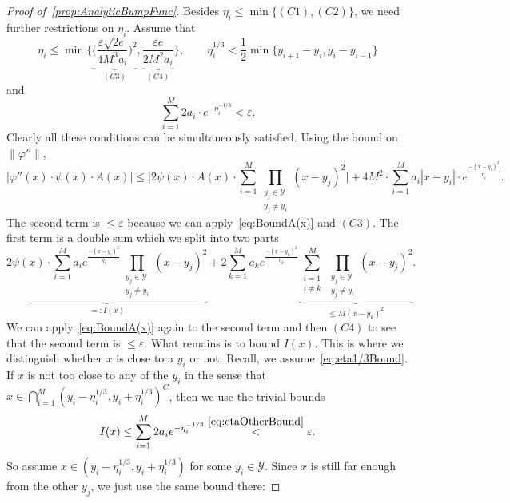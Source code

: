 \documentclass[12pt,]{article}
\theoremstyle{definition}
\theoremstyle{remark}
\newcommand{\0}{\mathbf{0}}
\begin{document}
{\begin{proof}[Proof of~\cref{prop:AnalyticBumpFunc}]
Besides $\eta_i\leq\min\{(C1),(C2)\}$, we need further restrictions on $\eta_i$. Assume that
\begin{equation}\label{eq:eta1/3Bound}
	\eta_i\leq \min \bigg\{ \underbrace{ \Big( \frac{\varepsilon\sqrt{2e}}{4M^3a_i} \Big)^2 }_{(C3)}, \underbrace{ \frac{\varepsilon e}{2M^2a_i} }_{(C4)} \bigg\},\qquad
	\eta_i^{1/3} < \frac{1}{2} \min\big\{ y_{i+1}-y_i, y_i-y_{i-1} \big\} 
\end{equation}
and
\begin{equation}\label{eq:etaOtherBound}
	\sum_{i=1}^M 2a_i\cdot e^{-\eta_i^{-1/3}} < \varepsilon.
\end{equation}
Clearly all these conditions can be simultaneously satisfied. Using the bound on $\|\varphi''\|$,
\begin{equation*}
	\big|\varphi''(x)\cdot \psi(x)\cdot A(x)\big|\leq  \bigg| 2\psi(x)\cdot A(x)\cdot \sum_{i=1}^{M}  \prod_{\substack{y_j\in\mathcal{Y}\\ y_j\neq y_i}} (x-y_j)^2 \bigg| + 4M^2\cdot \sum_{i=1}^{M} a_i|x-y_i| \cdot e^{\frac{-(x-y_i)^2}{\eta_i}}.
\end{equation*}
The second term is $\leq \varepsilon$ because we can apply~\cref{eq:BoundA(x)} and $(C3)$. The first term is a double sum which we split into two parts
\begin{equation*}
	\underbrace{2\psi(x)\cdot  \sum_{i=1}^{M} a_i e^{\frac{-(x-y_i)^2}{\eta_i}} \prod_{\substack{y_j\in\mathcal{Y}\\ y_j\neq y_i}} (x-y_j)^2}_{=: I(x)} +
	2 \sum_{k=1}^{M}  a_k  e^{\frac{-(x-y_k)^2}{\eta_k}} \underbrace{\sum_{\substack{i=1 \\ i\neq k}}^{M} \prod_{\substack{y_j\in\mathcal{Y}\\ y_j\neq y_i}} (x-y_j)^2}_{\leq M(x-y_k)^2}.
\end{equation*} 
We can apply~\cref{eq:BoundA(x)} again to the second term and then $(C4)$ to see that the second term is $\leq \varepsilon$. What remains is to bound $I(x)$. This is where we distinguish whether $x$ is close to a $y_i$ or not. Recall, we assume~\cref{eq:eta1/3Bound}. If $x$ is not too close to any of the $y_i$ in the sense that $x\in\bigcap_{i=1}^M (y_i-\eta_i^{1/3}, y_i+\eta_i^{1/3})^C$, then we use the trivial bounds
\begin{equation*}
	I(x) \leq \sum_{i=1}^{M} 2a_ie^{-\eta_i^{-1/3}} \stackrel{\eqref{eq:etaOtherBound}}{<} \varepsilon.
\end{equation*}
So assume $x\in(y_i-\eta_i^{1/3}, y_i+\eta_i^{1/3})$ for some $y_i\in\mathcal{Y}$. Since $x$ is still far enough from the other $y_j$, we just use the same bound there:

\end{proof}}
\end{document}
